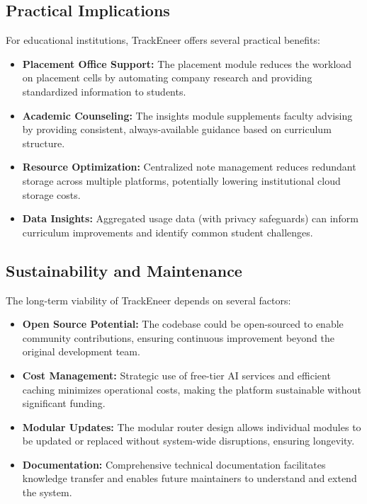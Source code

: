 \documentclass[12pt]{article}
\begin{document}
\subsection{Practical Implications}
For educational institutions, TrackEneer offers several practical benefits:

\begin{itemize}
    \item \textbf{Placement Office Support:} The placement module reduces the workload on placement cells by automating company research and providing standardized information to students.
    
    \item \textbf{Academic Counseling:} The insights module supplements faculty advising by providing consistent, always-available guidance based on curriculum structure.
    
    \item \textbf{Resource Optimization:} Centralized note management reduces redundant storage across multiple platforms, potentially lowering institutional cloud storage costs.
    
    \item \textbf{Data Insights:} Aggregated usage data (with privacy safeguards) can inform curriculum improvements and identify common student challenges.
\end{itemize}

\subsection{Sustainability and Maintenance}
The long-term viability of TrackEneer depends on several factors:

\begin{itemize}
    \item \textbf{Open Source Potential:} The codebase could be open-sourced to enable community contributions, ensuring continuous improvement beyond the original development team.
    
    \item \textbf{Cost Management:} Strategic use of free-tier AI services and efficient caching minimizes operational costs, making the platform sustainable without significant funding.
    
    \item \textbf{Modular Updates:} The modular router design allows individual modules to be updated or replaced without system-wide disruptions, ensuring longevity.
    
    \item \textbf{Documentation:} Comprehensive technical documentation facilitates knowledge transfer and enables future maintainers to understand and extend the system.
\end{itemize}
\end{document}
